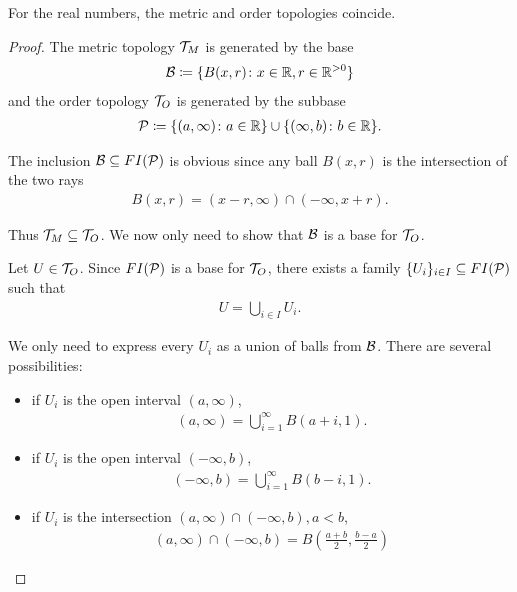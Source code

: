 \begin{theorem}\label{thm:real_metric_and_order_topologies_coincide}
  For the real numbers, the metric and order topologies coincide.
\end{theorem}
\begin{proof}
  The metric topology $\mathcal T_M$ is generated by the base
  \begin{align*}
    \mathcal B \coloneqq \{ B(x, r) \colon x \in \mathbb R, r \in \mathbb R^{>0} \}
  \end{align*}
  and the order topology $\mathcal T_O$ is generated by the subbase
  \begin{align*}
    \mathcal P \coloneqq \{ (a, \infty) \colon a \in \mathbb R \} \cup \{ (\infty, b) \colon b \in \mathbb R \}.
  \end{align*}

  The inclusion $\mathcal B \subseteq FI(\mathcal P)$ is obvious since any ball $B(x, r)$ is the intersection of the two rays
  \begin{align*}
    B(x, r) = (x - r, \infty) \cap (-\infty, x + r).
  \end{align*}

  Thus $\mathcal T_M \subseteq \mathcal T_O$. We now only need to show that $\mathcal B$ is a base for $\mathcal T_O$.

  Let $U \in \mathcal T_O$. Since $FI(\mathcal P)$ is a base for $\mathcal T_O$, there exists a family $\{ U_i \}_{i \in I} \subseteq FI(\mathcal P)$ such that
  \begin{align*}
    U = \bigcup_{i \in I} U_i.
  \end{align*}

  We only need to express every $U_i$ as a union of balls from $\mathcal B$. There are several possibilities:
  \begin{itemize}
    \item if $U_i$ is the open interval $(a, \infty)$,
    \begin{align*}
      (a, \infty) = \bigcup_{i=1}^\infty B(a + i, 1).
    \end{align*}

    \item if $U_i$ is the open interval $(-\infty, b)$,
    \begin{align*}
      (-\infty, b) = \bigcup_{i=1}^\infty B(b - i, 1).
    \end{align*}

    \item if $U_i$ is the intersection $(a, \infty) \cap (-\infty, b), a < b$,
    \begin{align*}
      (a, \infty) \cap (-\infty, b) = B(\tfrac {a + b} 2, \tfrac {b - a} 2)
    \end{align*}


\end{itemize}
\end{proof}
